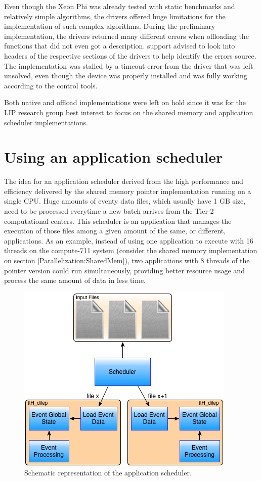 Even though the Xeon Phi was already tested with static benchmarks and relatively simple algorithms, the drivers offered huge limitations for the implementation of such complex algorithms. During the preliminary implementation, the drivers returned many different errors when offloading the functions that did not even got a description. \intel support advised to look into headers of the respective sections of the drivers to help identify the errors source. The implementation was stalled by a timeout error from the driver that was left unsolved, even though the device was properly installed and was fully working according to the \intel control tools.

Both native and offload implementations were left on hold since it was for the LIP research group best interest to focus on the shared memory and application scheduler implementations.

\section{Using an application scheduler}
\label{Parallelization:Scheduler}

The idea for an application scheduler derived from the high performance and efficiency delivered by the shared memory pointer implementation running on a single CPU. Huge amounts of eventy data files, which usually have 1 GB size, need to be processed everytime a new batch arrives from the Tier-2 computational centers. This scheduler is an application that manages the execution of those files among a given amount of the same, or different, applications. As an example, instead of using one application to execute with 16 threads on the compute-711 system (consider the shared memory implementation on section \ref{Parallelization:SharedMem}), two applications with 8 threads of the pointer version could run simultaneously, providing better resource usage and process the same amount of data in less time.

\begin{figure}[!htp]
	\begin{center}
		\includegraphics[scale=0.7]{../../common/img/scheduler_workflow.png}
		\caption{Schematic representation of the application scheduler.}
		\label{fig:SchedulerWorkflow}
	\end{center}
\end{figure}

